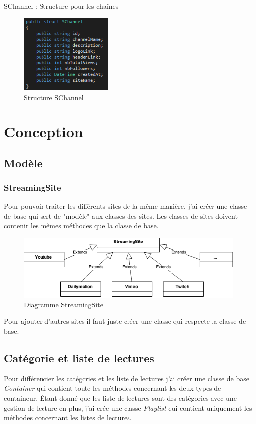 \documentclass[11pt]{report} %
\begin{document}
			SChannel : Structure pour les chaînes
			
			\begin{figure}[h]
				\center
				\includegraphics[width=0.4\textwidth]{../img/SChannel.png}
				\caption{Structure SChannel}
				\label{SChanel}
			\end{figure}
	
	\section{Conception}
		\subsection{Modèle}
			\subsubsection{StreamingSite}
			Pour pouvoir traiter les différents sites de la même manière, j'ai créer une classe de base qui sert de "modèle" aux classes des sites.
			Les classes de sites doivent contenir les mêmes méthodes que la classe de base.
			
			\begin{figure}[h]
				\center
				\includegraphics[width=1\textwidth]{../img/StreamingSite.png}
				\caption{Diagramme StreamingSite}
				\label{streaming site}
			\end{figure}
			
			Pour ajouter d'autres sites il faut juste créer une classe qui respecte la classe de base.
	
			\subsection{Catégorie et liste de lectures}
			Pour différencier les catégories et les liste de lectures j'ai créer une classe de base \textit{Container} qui contient toute les méthodes concernant les deux types de containeur.
			Étant donné que les liste de lectures sont des catégories avec une gestion de lecture en plus, j'ai crée une classe \textit{Playlist} qui contient uniquement les méthodes concernant les listes de lectures.
			
\end{document}
